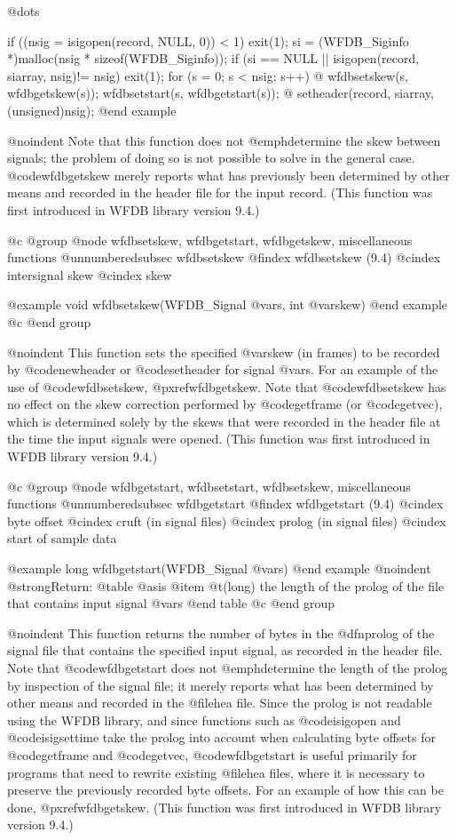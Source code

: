 {{{{{{{{{{@dots{}

if ((nsig = isigopen(record, NULL, 0)) < 1)
    exit(1);
si = (WFDB_Siginfo *)malloc(nsig * sizeof(WFDB_Siginfo));
if (si == NULL || isigopen(record, siarray, nsig)!= nsig)
    exit(1);
for (s = 0; s < nsig; s++) @{
    wfdbsetskew(s, wfdbgetskew(s));
    wfdbsetstart(s, wfdbgetstart(s));
@}
setheader(record, siarray, (unsigned)nsig);
@end example

@noindent
Note that this function does not @emph{determine} the skew between
signals;  the problem of doing so is not possible to solve in the
general case.  @code{wfdbgetskew} merely reports what has previously been
determined by other means and recorded in the header file for the input
record.  (This function was first introduced in WFDB library version 9.4.)

@c @group
@node     wfdbsetskew, wfdbgetstart, wfdbgetskew, miscellaneous functions
@unnumberedsubsec wfdbsetskew
@findex wfdbsetskew (9.4)
@cindex intersignal skew
@cindex skew

@example
void wfdbsetskew(WFDB_Signal @var{s}, int @var{skew})
@end example
@c @end group

@noindent
This function sets the specified @var{skew} (in frames) to be recorded
by @code{newheader} or @code{setheader} for signal @var{s}.  For an
example of the use of @code{wfdbsetskew}, @pxref{wfdbgetskew}.  Note that
@code{wfdbsetskew} has no effect on the skew correction performed by
@code{getframe} (or @code{getvec}), which is determined solely by the
skews that were recorded in the header file at the time the input
signals were opened.  (This function was first introduced in WFDB library
version 9.4.)

@c @group
@node     wfdbgetstart, wfdbsetstart, wfdbsetskew, miscellaneous functions
@unnumberedsubsec wfdbgetstart
@findex wfdbgetstart (9.4)
@cindex byte offset
@cindex cruft (in signal files)
@cindex prolog (in signal files)
@cindex start of sample data

@example
long wfdbgetstart(WFDB_Signal @var{s})
@end example
@noindent
@strong{Return:}
@table @asis
@item @t{(long)}
the length of the prolog of the file that contains input signal @var{s}
@end table
@c @end group

@noindent
This function returns the number of bytes in the @dfn{prolog} of the
signal file that contains the specified input signal, as recorded in the
header file.  Note that @code{wfdbgetstart} does not
@emph{determine} the length of the prolog by inspection of the signal
file; it merely reports what has been determined by other means and
recorded in the @file{hea} file.  Since the prolog is not readable
using the WFDB library, and since functions such as @code{isigopen} and
@code{isigsettime} take the prolog into account when calculating byte
offsets for @code{getframe} and @code{getvec}, @code{wfdbgetstart} is
useful primarily for programs that need to rewrite existing
@file{hea} files, where it is necessary to preserve the previously
recorded byte offsets.  For an example of how this can be done,
@pxref{wfdbgetskew}.  (This function was first introduced in WFDB library
version 9.4.)

}}}}}}}}}}
